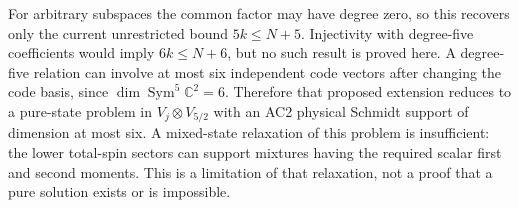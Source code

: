 \documentclass[11pt]{article}
\begin{document}
For arbitrary subspaces the common factor may have degree zero, so this
recovers only the current unrestricted bound $5k\le N+5$.
Injectivity with degree-five coefficients would imply $6k\le N+6$,
but no such result is proved here. A degree-five relation can involve at
most six independent code vectors after changing the code basis, since
$\dim\operatorname{Sym}^5\mathbb C^2=6$. Therefore that proposed extension
reduces to a pure-state problem in $V_j\otimes V_{5/2}$ with an AC2
physical Schmidt support of dimension at most six. A mixed-state
relaxation of this problem is insufficient: the lower total-spin sectors
can support mixtures having the required scalar first and second moments.
This is a limitation of that relaxation, not a proof that a pure solution
exists or is impossible.
\end{document}
